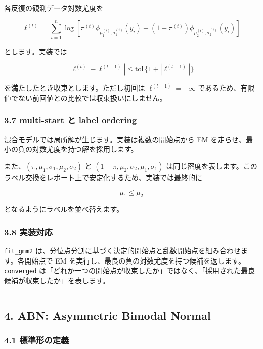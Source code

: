\documentclass[
]{article}
\begin{document}
各反復の観測データ対数尤度を

\[
\ell^{(t)}=
\sum_{i=1}^{n}\log\left[\pi^{(t)}\phi_{\mu_1^{(t)},\sigma_1^{(t)}}(y_i)
+(1-\pi^{(t)})\phi_{\mu_2^{(t)},\sigma_2^{(t)}}(y_i)\right]
\]

とします。実装では

\[
|\ell^{(t)}-\ell^{(t-1)}|
\le \mathrm{tol}\,\{1+|\ell^{(t-1)}|\}
\]

を満たしたとき収束とします。ただし初回は \(\ell^{(t-1)}=-\infty\)
であるため、有限値でない前回値との比較では収束扱いにしません。

\hypertarget{multi-start-ux3068-label-ordering}{%
\subsubsection{3.7 multi-start と label
ordering}\label{multi-start-ux3068-label-ordering}}

混合モデルでは局所解が生じます。実装は複数の開始点から EM
を走らせ、最小の負の対数尤度を持つ解を採用します。

また、\((\pi,\mu_1,\sigma_1,\mu_2,\sigma_2)\) と
\((1-\pi,\mu_2,\sigma_2,\mu_1,\sigma_1)\)
は同じ密度を表します。このラベル交換をレポート上で安定化するため、実装では最終的に

\[
\mu_1\le \mu_2
\]

となるようにラベルを並べ替えます。

\hypertarget{ux5b9fux88c5ux5bfeux5fdc-1}{%
\subsubsection{3.8 実装対応}\label{ux5b9fux88c5ux5bfeux5fdc-1}}

\texttt{fit\_gmm2}
は、分位点分割に基づく決定的開始点と乱数開始点を組み合わせます。各開始点で
EM を実行し、最良の負の対数尤度を持つ候補を返します。\texttt{converged}
は「どれか一つの開始点が収束したか」ではなく、「採用された最良候補が収束したか」を表します。

\begin{center}\rule{0.5\linewidth}{0.5pt}\end{center}

\hypertarget{abn-asymmetric-bimodal-normal}{%
\subsection{4. ABN: Asymmetric Bimodal
Normal}\label{abn-asymmetric-bimodal-normal}}

\hypertarget{ux6a19ux6e96ux5f62ux306eux5b9aux7fa9}{%
\subsubsection{4.1
標準形の定義}\label{ux6a19ux6e96ux5f62ux306eux5b9aux7fa9}}
\end{document}
